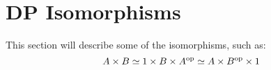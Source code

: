 
\section{DP Isomorphisms}

\begin{publictodo}
    This section will describe some of the isomorphisms, such as:
    \begin{equation}
        A \times B \simeq 1 \times B \times A^{\mathrm{op}} \simeq A \times B^{\mathrm{op}} \times 1
    \end{equation}
\end{publictodo}

